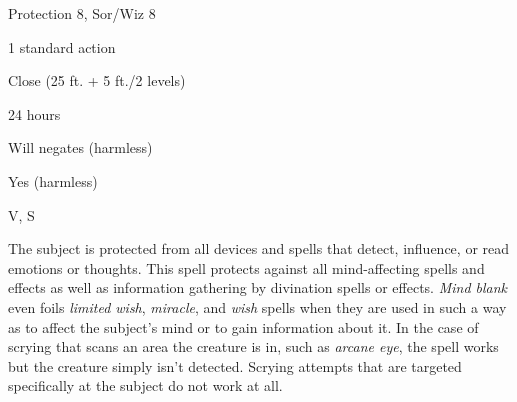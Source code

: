 
\begin{description*}
\item[Level:] Protection 8, Sor/Wiz 8
\item[Casting Time:] 1 standard action
\item[Range:] Close (25 ft. + 5 ft./2 levels)
\item[Duration:] 24 hours
\item[Saving Throw:] Will negates (harmless)
\item[Spell Resistance:] Yes (harmless)
\item[Components:] V, S
\end{description*}

The subject is protected from all devices and spells that detect, influence, or
read emotions or thoughts. This spell protects against all mind-affecting spells
and effects as well as information gathering by divination spells or effects. \textit{Mind
blank} even foils \textit{limited wish}, \textit{miracle}, and \textit{wish} spells
when they are used in such a way as to affect the subject's mind or to gain information
about it. In the case of scrying that scans an area the creature is in, such as
\textit{arcane eye}, the spell works but the creature simply isn't detected. Scrying
attempts that are targeted specifically at the subject do not work at all.